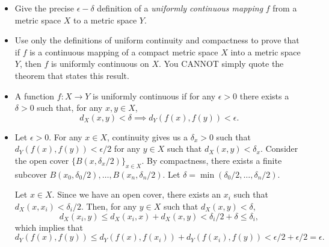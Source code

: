 \begin{problem}
\begin{itemize}
    \item[(a)] Give the precise $\epsilon - \delta$ definition of a \emph{uniformly continuous mapping} $f$ from a metric space $X$ to a metric space $Y$.
    \item[(b)] Use only the definitions of uniform continuity and compactness to prove that if $f$ is a continuous mapping of a compact metric space $X$ into a metric space $Y$, then $f$ is uniformly continuous on $X$. You CANNOT simply quote the theorem that states this result.
\end{itemize}
\begin{solution}
\begin{itemize}
    \item[(a)] A function $f: X \to Y$ is uniformly continuous if for any $\epsilon > 0$ there exists a $\delta > 0$ such that, for any $x, y \in X$,
    $$ d_X(x,y) < \delta \implies d_Y(f(x), f(y)) < \epsilon. $$
    \item[(b)] Let $\epsilon > 0$. For any $x \in X$, continuity gives us a $\delta_x > 0$ such that $d_Y(f(x), f(y)) < \epsilon/2$ for any $y \in X$ such that $d_X(x,y) < \delta_x$. Consider the open cover $\{B(x, \delta_x/2)\}_{x \in X}$. By compactness, there exists a finite subcover $B(x_0, \delta_0/2), \ldots, B(x_n, \delta_n/2)$. Let $\delta = \min(\delta_0/2, \ldots, \delta_n/2)$.
    
    Let $x \in X$. Since we have an open cover, there exists an $x_i$ such that $d_X(x, x_i) < \delta_i/2$. Then, for any $y \in X$ such that $d_X(x, y) < \delta$,
    $$ d_X(x_i, y) \leq d_X(x_i,x) + d_X(x,y) < \delta_i/2 + \delta \leq \delta_i, $$
    which implies that
    $$ d_Y(f(x), f(y)) \leq d_Y(f(x), f(x_i)) + d_Y(f(x_i), f(y)) < \epsilon/2 + \epsilon/2 = \epsilon.$$
\end{itemize}
\end{solution}
\end{problem}


